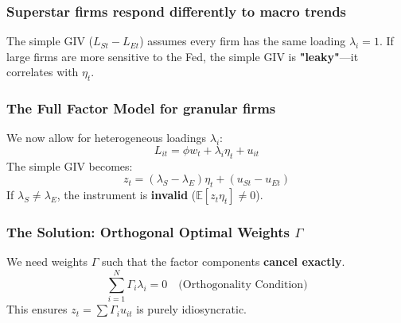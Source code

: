 \documentclass[aspectratio=169,11pt]{beamer}
\begin{document}
\begin{frame}
    \frametitle{Superstar firms respond differently to macro trends}
    \vspace{1cm}
    {\Large
        The simple GIV ($L_{St} - L_{Et}$) assumes every firm has the same loading $\lambda_i = 1$.
    }
    \vspace{1cm}
    {\Large
        If large firms are more sensitive to the Fed, the simple GIV is \textbf{"leaky"}—it correlates with $\eta_t$.
    }
\end{frame}



\begin{frame}
    \frametitle{The Full Factor Model for granular firms}
    \vspace{0.5cm}
    We now allow for heterogeneous loadings $\lambda_i$:
    \vspace{0.5cm}
    \begin{equation}
        L_{it} = \phi w_t + \lambda_i \eta_t + u_{it} \tag{Full Factor Model}
    \end{equation}
    \vspace{0.5cm}
    The simple GIV becomes:
    \begin{equation*}
        z_t = (\lambda_S - \lambda_E) \eta_t + (u_{St} - u_{Et})
    \end{equation*}
    \vspace{0.5cm}
    {\Large
        If $\lambda_S \neq \lambda_E$, the instrument is \textbf{invalid} ($\mathbb{E}[z_t \eta_t] \neq 0$).
    }
\end{frame}

\begin{frame}
    \frametitle{The Solution: Orthogonal Optimal Weights $\Gamma$}
    \vspace{0.5cm}
    {\Large
        We need weights $\Gamma$ such that the factor components \textbf{cancel exactly}.
    }
    \vspace{1cm}
    \begin{equation*}
        \sum_{i=1}^N \Gamma_i \lambda_i = 0 \quad \text{(Orthogonality Condition)}
    \end{equation*}
    \vspace{0.5cm}
    {\Large
        This ensures $z_t = \sum \Gamma_i u_{it}$ is purely idiosyncratic.
    }
\end{frame}

\end{document}
